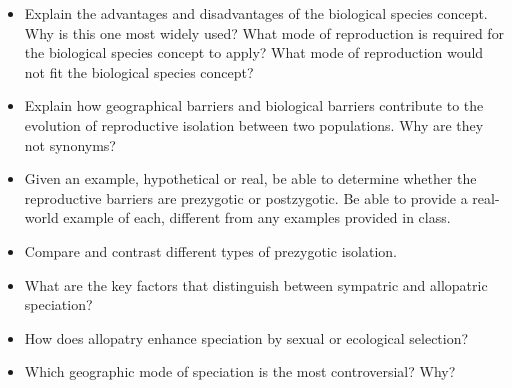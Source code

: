 \documentclass[letterpaper]{tufte-handout}
\begin{document}
\begin{itemize}
	\item Explain the advantages and disadvantages of the biological species concept.  Why is this one most widely used?  What mode of reproduction is required for the biological species concept to apply?  What mode of reproduction would not fit the biological species concept?

	\item Explain how geographical barriers and biological barriers contribute to the evolution of reproductive isolation between two populations.  Why are they not synonyms?

	\item Given an example, hypothetical or real, be able to determine whether the reproductive barriers are prezygotic or postzygotic.  Be able to provide a real-world example of each, different from any examples provided in class.

	\item Compare and contrast different types of prezygotic isolation.

	\item What are the key factors that distinguish between sympatric and allopatric speciation?

	\item How does allopatry enhance speciation by sexual or ecological selection?

	\item Which geographic mode of speciation is the most controversial?  Why?

\end{itemize}
\end{document}
